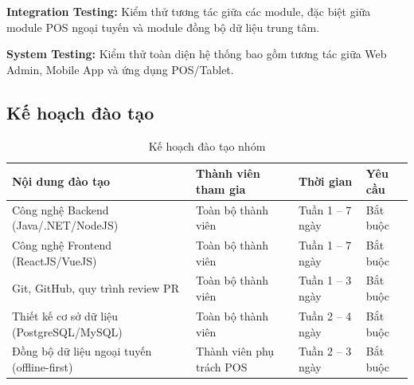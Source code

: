 \textbf{Integration Testing:} Kiểm thử tương tác giữa các module, đặc biệt giữa module POS ngoại tuyến và module đồng bộ dữ liệu trung tâm.

\textbf{System Testing:} Kiểm thử toàn diện hệ thống bao gồm tương tác giữa Web Admin, Mobile App và ứng dụng POS/Tablet.

\subsection{Kế hoạch đào tạo}
\begin{table}[htbp]
    \centering
    \small
    \caption{Kế hoạch đào tạo nhóm}
    \begin{tabular}{|p{3.5cm}|p{3cm}|p{3cm}|p{2.5cm}|}
        \hline
        \textbf{Nội dung đào tạo} & \textbf{Thành viên tham gia} & \textbf{Thời gian} & \textbf{Yêu cầu} \\
        \hline
        Công nghệ Backend (Java/.NET/NodeJS) & Toàn bộ thành viên & Tuần 1 -- 7 ngày & Bắt buộc \\
        \hline
        Công nghệ Frontend (ReactJS/VueJS) & Toàn bộ thành viên & Tuần 1 -- 7 ngày & Bắt buộc \\
        \hline
        Git, GitHub, quy trình review PR & Toàn bộ thành viên & Tuần 1 -- 3 ngày & Bắt buộc \\
        \hline
        Thiết kế cơ sở dữ liệu (PostgreSQL/MySQL) & Toàn bộ thành viên & Tuần 2 -- 4 ngày & Bắt buộc \\
        \hline
        Đồng bộ dữ liệu ngoại tuyến (offline-first) & Thành viên phụ trách POS & Tuần 2 -- 3 ngày & Bắt buộc \\
        \hline
    \end{tabular}
\end{table}